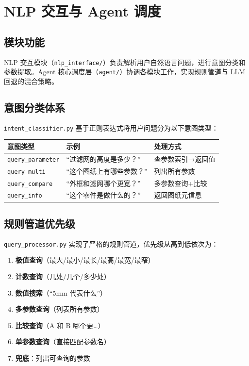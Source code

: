 \documentclass[11pt,a4paper]{article}
\begin{document}
\section{NLP 交互与 Agent 调度}

\subsection{模块功能}

NLP 交互模块（\texttt{nlp\_interface/}）负责解析用户自然语言问题，进行意图分类和参数提取。Agent 核心调度层（\texttt{agent/}）协调各模块工作，实现规则管道与 LLM 回退的混合策略。

\subsection{意图分类体系}

\texttt{intent\_classifier.py} 基于正则表达式将用户问题分为以下意图类型：

\begin{table}[H]
\centering
\begin{tabular}{lll}
\toprule
意图类型 & 示例 & 处理方式 \\
\midrule
\texttt{query\_parameter} & “过滤网的高度是多少？” & 查参数索引→返回值 \\
\texttt{query\_multi} & “这个图纸上有哪些参数？” & 列出所有参数 \\
\texttt{query\_compare} & “外框和滤网哪个更宽？” & 多参数查询+比较 \\
\texttt{query\_info} & “这个零件是做什么的？” & 返回图纸元信息 \\
\bottomrule
\end{tabular}
\end{table}

\subsection{规则管道优先级}

\texttt{query\_processor.py} 实现了严格的规则管道，优先级从高到低依次为：

\begin{enumerate}[nosep]
  \item \textbf{极值查询}（最大/最小/最长/最高/最宽/最窄）
  \item \textbf{计数查询}（几处/几个/多少处）
  \item \textbf{数值搜索}（“5mm 代表什么”）
  \item \textbf{多参数查询}（列表所有参数）
  \item \textbf{比较查询}（A 和 B 哪个更…）
  \item \textbf{单参数查询}（直接匹配参数名）
  \item \textbf{兜底}：列出可查询的参数
\end{enumerate}
\end{document}
